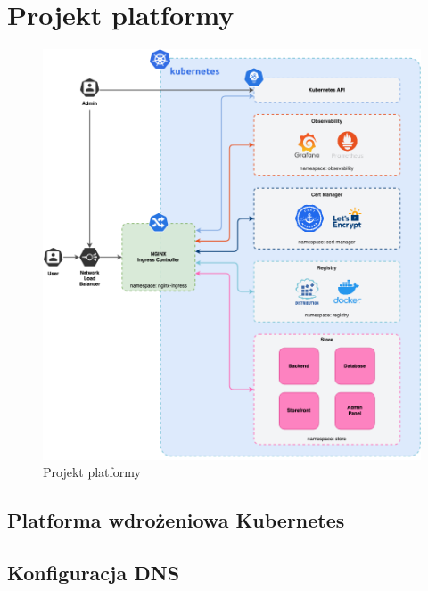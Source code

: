 \newpage

\section{Projekt platformy}\label{sec:projekt-platformy}


\begin{figure}[p]
    \centering
    \includegraphics[width=\textwidth]{img/main-infra-model}
    \caption{Projekt platformy}
    \label{fig:platform-model}
\end{figure}

\subsection{Platforma wdrożeniowa Kubernetes}\label{subsec:platforma-wdrozeniowa-kubernetes}


\subsection{Konfiguracja DNS}\label{subsec:konfiguracja-dns}

